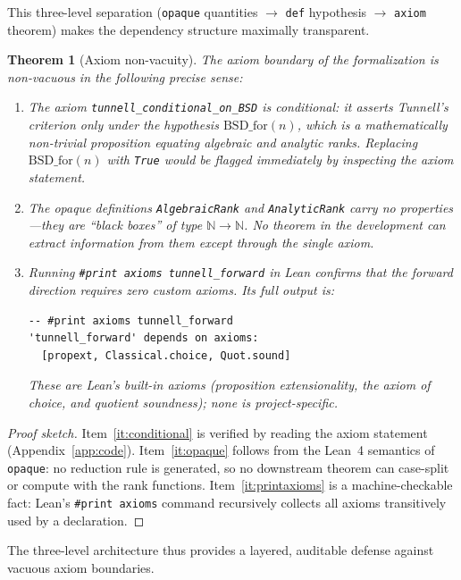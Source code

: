 \documentclass[11pt,a4paper]{article}
\newtheorem{theorem}{Theorem}[section]
\theoremstyle{definition}
\newcommand{\lean}[1]{\texttt{#1}}
\newcommand{\BSDfor}{\mathrm{BSD\_for}}
\begin{document}
This three-level separation (\lean{opaque} quantities $\to$
\lean{def} hypothesis $\to$ \lean{axiom} theorem) makes the
dependency structure maximally transparent.

\begin{theorem}[Axiom non-vacuity]\label{thm:nonvacuity}
The axiom boundary of the formalization is non-vacuous in the
following precise sense:
\begin{enumerate}[nosep]
  \item\label{it:conditional}
    The axiom \lean{tunnell\_conditional\_on\_BSD} is
    \emph{conditional}: it asserts Tunnell's criterion only under
    the hypothesis $\BSDfor(n)$, which is a mathematically
    non-trivial proposition equating algebraic and analytic ranks.
    Replacing $\BSDfor(n)$ with \lean{True} would be flagged
    immediately by inspecting the axiom statement.
  \item\label{it:opaque}
    The opaque definitions \lean{AlgebraicRank} and
    \lean{AnalyticRank} carry no properties---they are
    ``black boxes'' of type $\mathbb{N} \to \mathbb{N}$.  No
    theorem in the development can extract information from them
    except through the single axiom.
  \item\label{it:printaxioms}
    Running \texttt{\#print axioms tunnell\_forward} in Lean
    confirms that the forward direction requires \emph{zero}
    custom axioms.  Its full output is:
\begin{lstlisting}[numbers=none,frame=none,xleftmargin=2em]
-- #print axioms tunnell_forward
'tunnell_forward' depends on axioms:
  [propext, Classical.choice, Quot.sound]
\end{lstlisting}
    These are Lean's built-in axioms (proposition extensionality,
    the axiom of choice, and quotient soundness); none is
    project-specific.
\end{enumerate}
\end{theorem}
\begin{proof}[Proof sketch]
Item~\ref{it:conditional} is verified by reading the axiom
statement (Appendix~\ref{app:code}).  Item~\ref{it:opaque}
follows from the Lean~4 semantics of \lean{opaque}: no reduction
rule is generated, so no downstream theorem can case-split or
compute with the rank functions.  Item~\ref{it:printaxioms} is
a machine-checkable fact: Lean's \texttt{\#print axioms} command
recursively collects all axioms transitively used by a declaration.
\end{proof}

The three-level architecture thus provides a layered, auditable
defense against vacuous axiom boundaries.
\end{document}
